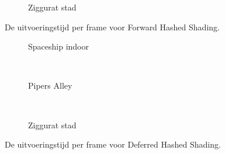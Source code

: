 \begin{figure}[t]
\begin{minipage}[t]{0.5\textwidth}
  \begin{adjustbox}{minipage=\textwidth, scale=0.55}
    \begin{subfigure}[b]{1.6\textwidth}
      \centering
      \def\svgwidth{\textwidth}
      
      \caption{Ziggurat stad}
      \label{fig:hs-compare-frames:forward:city}
    \end{subfigure}
  \end{adjustbox}
  \caption{\small De uitvoeringstijd per frame voor Forward Hashed Shading.}
  \label{fig:hs-compare-frames:forward}
  \end{minipage}%
  \begin{minipage}[t]{0.5\textwidth}
  \begin{adjustbox}{minipage=\textwidth, scale=0.55}
    \begin{subfigure}[b]{1.6\textwidth}
      \centering
      \def\svgwidth{\textwidth}
      
      \caption{Spaceship indoor}
      \vspace{4pt}
      \label{fig:hs-compare-frames:deferred:indoor}
    \end{subfigure}
  \end{adjustbox} \\
  \begin{adjustbox}{minipage=\textwidth, scale=0.55}
    \begin{subfigure}[b]{1.6\textwidth}
      \centering
      \def\svgwidth{\textwidth}
      
      \caption{Pipers Alley}
      \vspace{4pt}
      \label{fig:hs-compare-frames:deferred:alley}
    \end{subfigure}
  \end{adjustbox} \\
  \begin{adjustbox}{minipage=\textwidth, scale=0.55}
    \begin{subfigure}[b]{1.6\textwidth}
      \centering
      \def\svgwidth{\textwidth}
      
      \caption{Ziggurat stad}
      \label{fig:hs-compare-frames:deferred:city}
    \end{subfigure}
  \end{adjustbox}
  \caption{\small De uitvoeringstijd per frame voor Deferred Hashed Shading.}
  \label{fig:hs-compare-frames:deferred}
  \end{minipage} 
\end{figure}
